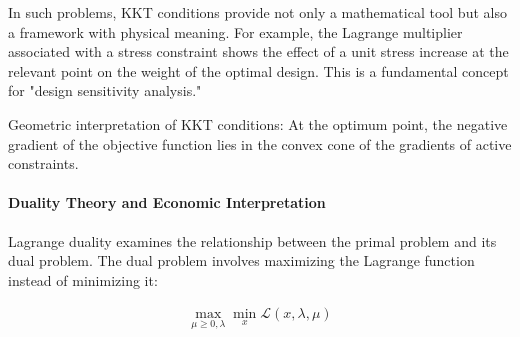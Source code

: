 In such problems, KKT conditions provide not only a mathematical tool but also a framework with physical meaning. For example, the Lagrange multiplier associated with a stress constraint shows the effect of a unit stress increase at the relevant point on the weight of the optimal design. This is a fundamental concept for "design sensitivity analysis."

\begin{marginfigure}
\centering
{}
\caption{Geometric interpretation of KKT conditions: At the optimum point, the negative gradient of the objective function lies in the convex cone of the gradients of active constraints.}
\label{fig:kkt_geometry}
\end{marginfigure}

\paragraph{Duality Theory and Economic Interpretation}
Lagrange duality examines the relationship between the primal problem and its dual problem. The dual problem involves maximizing the Lagrange function instead of minimizing it:

\begin{equation}
\begin{aligned}
\max_{\mu \geq 0, \lambda} \min_{x} \mathcal{L}(x,\lambda,\mu)
\end{aligned}
\end{equation}

